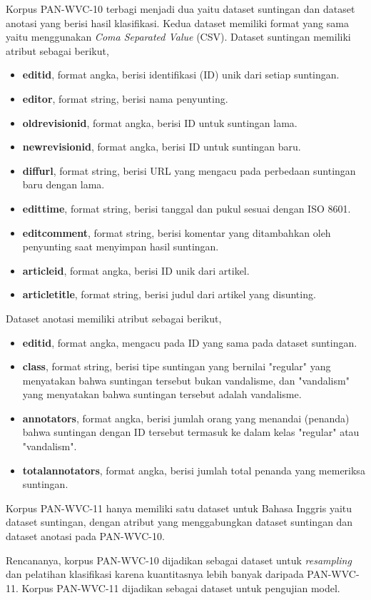 Korpus PAN-WVC-10 terbagi menjadi dua yaitu dataset suntingan dan dataset anotasi yang berisi hasil klasifikasi.
Kedua dataset memiliki format yang sama yaitu menggunakan \textit{Coma Separated Value} (CSV).
Dataset suntingan memiliki atribut sebagai berikut,
\begin{itemize}
	\item \textbf{editid}, format angka, berisi identifikasi (ID) unik dari setiap suntingan.
	\item \textbf{editor}, format string, berisi nama penyunting.
	\item \textbf{oldrevisionid}, format angka, berisi ID untuk suntingan lama.
	\item \textbf{newrevisionid}, format angka, berisi ID untuk suntingan baru.
	\item \textbf{diffurl}, format string, berisi URL yang mengacu pada perbedaan suntingan baru dengan lama.
	\item \textbf{edittime}, format string, berisi tanggal dan pukul sesuai dengan ISO 8601.
	\item \textbf{editcomment}, format string, berisi komentar yang ditambahkan oleh penyunting saat menyimpan hasil suntingan.
	\item \textbf{articleid}, format angka, berisi ID unik dari artikel.
	\item \textbf{articletitle}, format string, berisi judul dari artikel yang disunting.
\end{itemize}

Dataset anotasi memiliki atribut sebagai berikut,
\begin{itemize}
	\item \textbf{editid}, format angka, mengacu pada ID yang sama pada dataset suntingan.
	\item \textbf{class}, format string, berisi tipe suntingan yang bernilai "regular" yang menyatakan bahwa suntingan tersebut bukan vandalisme, dan "vandalism" yang menyatakan bahwa suntingan tersebut adalah vandalisme.
	\item \textbf{annotators}, format angka, berisi jumlah orang yang menandai (penanda) bahwa suntingan dengan ID tersebut termasuk ke dalam kelas "regular" atau "vandalism".
	\item \textbf{totalannotators}, format angka, berisi jumlah total penanda yang memeriksa suntingan.
\end{itemize}

Korpus PAN-WVC-11 hanya memiliki satu dataset untuk Bahasa Inggris yaitu dataset suntingan, dengan atribut yang menggabungkan dataset suntingan dan dataset anotasi pada PAN-WVC-10.

Rencananya, korpus PAN-WVC-10 dijadikan sebagai dataset untuk \textit{resampling} dan pelatihan klasifikasi karena kuantitasnya lebih banyak daripada PAN-WVC-11.
Korpus PAN-WVC-11 dijadikan sebagai dataset untuk pengujian model.

